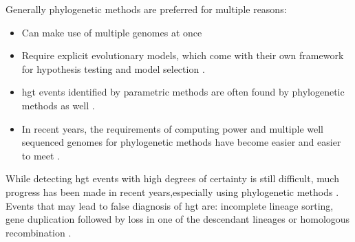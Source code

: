 Generally phylogenetic methods are preferred for multiple reasons:
\begin{itemize}
    \item Can make use of multiple genomes at once \citep{ihgt}
    \item Require explicit evolutionary models, which come with their own framework for hypothesis testing and model selection \citep{ihgt}.
    \item \ac{hgt} events identified by parametric methods are often found by phylogenetic methods as well \citep{ihgt}.
    \item In recent years, the requirements of computing power and  multiple well sequenced genomes for phylogenetic methods have become easier and easier to meet \citep{ihgt}.
\end{itemize}
While detecting \ac{hgt} events with high degrees of certainty is still difficult, much progress has been made in recent years,especially using phylogenetic methods \citep{ihgt}.
Events that may lead to false diagnosis of \ac{hgt} are: incomplete lineage sorting, gene duplication followed by loss in one of the descendant lineages or homologous recombination \citep{ihgt,hgterr}.
